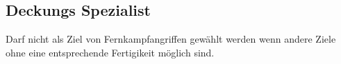 \subsection{Deckungs Spezialist}

Darf nicht als Ziel von Fernkampfangriffen gewählt werden wenn andere Ziele ohne eine entsprechende Fertigikeit möglich sind.